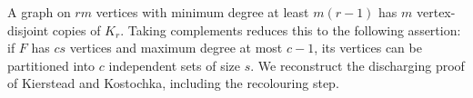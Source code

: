 A graph on \(rm\) vertices with minimum degree at least \(m(r-1)\) has \(m\) vertex-disjoint copies of \(K_r\).
Taking complements reduces this to the following assertion: if \(F\) has \(cs\) vertices and maximum degree at most \(c-1\), its vertices can be partitioned into \(c\) independent sets of size \(s\). We reconstruct the discharging proof of Kierstead and Kostochka, including the recolouring step.
